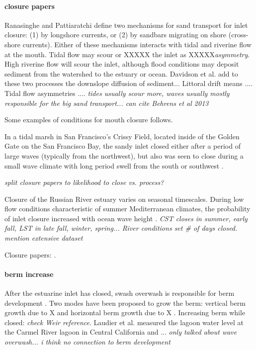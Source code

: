 \paragraph{closure papers} 
Ranasinghe and Pattiaratchi \parencite*{ranasinghe_seasonal_2003} define two mechanisms for sand transport for inlet closure: (1) by longshore currents, or (2) by sandbars migrating on shore (cross-shore currents). Either of these mechanisms interacts  with tidal and riverine flow at the mouth. Tidal flow may scour or XXXXX the inlet as XXXXX\emph{asymmetry}. High riverine flow will scour the inlet, although flood conditions may deposit sediment from the watershed to the estuary or ocean.  Davidson et al. \parencite*{davidson_simple_2009} add to these two processes the downslope diffusion of sediment... Littoral drift means .... Tidal flow asymmetries .... \emph{tides usually scour more, waves usually mostly responsible for the big sand transport... can cite Behrens et al 2013}

Some examples of conditions for mouth closure follows. 

In a tidal marsh in San Francisco's Crissy Field, located inside of the Golden Gate on the San Francisco Bay, the sandy inlet closed either after a period of large waves (typically from the northwest), but also was seen to close during a small wave climate with long period swell from the south or southwest \parencite{hanes_waves_2011}. 

\emph{split closure papers to likelihood to close vs. process?}

Closure of the Russian River estuary varies on seasonal timescales. During low flow conditions characteristic of summer Mediterranean climates, the probability of inlet closure increased with ocean wave height \parencite{behrens_episodic_2013}. \emph{CST closes in summer, early fall, LST in late fall, winter, spring... River conditions set \# of days closed. mention extensive dataset}

Closure papers: \parencite{ranasinghe_seasonal_2003, elwany_opening_1998, hanes_waves_2011, behrens_characterization_2009, behrens_episodic_2013}.

\paragraph{berm increase}
After the estuarine inlet has closed, swash overwash is responsible for berm development \parencite{baldock_morphodynamic_2008}. Two modes have been proposed to grow the berm: vertical berm growth due to X and horizontal berm growth due to X \parencite{weir_beach_2006}. 
Increasing berm while closed: \parencite{baldock_morphodynamic_2008, laudier_measured_2011, weir_beach_2006} \emph{check Weir reference}. 
Laudier et al. \parencite*{laudier_measured_2011} measured the lagoon water level at the Carmel River lagoon in Central California and ... \emph{only talked about wave overwash... i think no connection to berm development}


